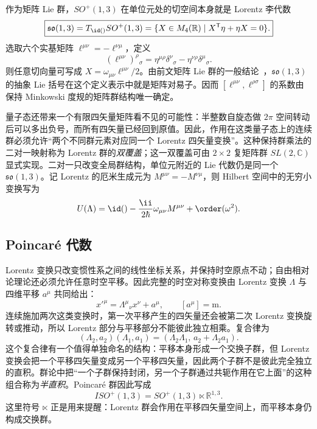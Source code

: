 作为矩阵 Lie 群，$SO^+(1,3)$ 在单位元处的切空间本身就是 Lorentz 李代数
\begin{equation}
\boxed{
\mathfrak{so}(1,3)
=T_{\id()}SO^+(1,3)
=\{X\in M_4(\mathbb R)\mid X^{\mathsf T}\eta+\eta X=0\}.}
\label{eq:lorentz-lie-algebra-tangent}
\end{equation}
选取六个实基矩阵 $\ell^{\mu\nu}=-\ell^{\nu\mu}$，定义
\begin{equation}
\boxed{
(\ell^{\mu\nu})^\rho{}_{\sigma}
=\eta^{\mu\rho}\delta^\nu{}_{\sigma}
-\eta^{\nu\rho}\delta^\mu{}_{\sigma}.}
\label{eq:lorentz-matrix-basis}
\end{equation}
则任意切向量可写成 $X=\omega_{\mu\nu}\ell^{\mu\nu}/2$。由前文矩阵 Lie 群的一般结论~，$\mathfrak{so}(1,3)$ 的抽象 Lie 括号在这个定义表示中就是矩阵对易子。因而 $[\ell^{\mu\nu},\ell^{\rho\sigma}]$ 的系数由保持 Minkowski 度规的矩阵群结构唯一确定。

量子态还带来一个有限四矢量矩阵看不见的可能性：半整数自旋态做 $2\pi$ 空间转动后可以多出负号，而所有四矢量已经回到原值。因此，作用在这类量子态上的连续群必须允许“两个不同群元素对应同一个 Lorentz 四矢量变换”。这种保持群乘法的二对一映射称为 Lorentz 群的\emph{双覆盖}；这一双覆盖可由 $2\times2$ 复矩阵群 $SL(2,\mathbb C)$ 显式实现。二对一只改变全局群结构，单位元附近的 Lie 代数仍是同一个 $\mathfrak{so}(1,3)$。记 Lorentz 的厄米生成元为 $M^{\mu\nu}=-M^{\nu\mu}$，则 Hilbert 空间中的无穷小变换写为
\begin{equation}
 U(\Lambda)
 =\id()-\frac{\ii}{2\hbar}\omega_{\mu\nu}M^{\mu\nu}+\order(\omega^2).
 \label{eq:lorentz-unitary}
\end{equation}
\subsection{Poincar\'e 代数}

Lorentz 变换只改变惯性系之间的线性坐标关系，并保持时空原点不动；自由相对论理论还必须允许任意时空平移。因此完整的时空对称变换由 Lorentz 变换 $\Lambda$ 与四维平移 $a^\mu$ 共同给出：
\begin{equation}
 x'^\mu=\Lambda^\mu{}_{\nu}x^\nu+a^\mu,
 \qquad [a^\mu]=\mathrm m.
 \label{eq:poincare-affine-action-r15}
\end{equation}
连续施加两次这类变换时，第一次平移产生的四矢量还会被第二次 Lorentz 变换旋转或推动，所以 Lorentz 部分与平移部分不能彼此独立相乘。复合律为
\begin{equation}
 \boxed{
 (\Lambda_2,a_2)(\Lambda_1,a_1)
 =(\Lambda_2\Lambda_1,\,a_2+\Lambda_2a_1).}
 \label{eq:poincare-group-law-r15}
\end{equation}
这个复合律有一个值得单独命名的结构：平移本身形成一个交换子群，但 Lorentz 变换会把一个平移四矢量变成另一个平移四矢量，因此两个子群不是彼此完全独立的直积。群论中把“一个子群保持封闭，另一个子群通过共轭作用在它上面”的这种组合称为\emph{半直积}。Poincar\'e 群因此写成
\begin{equation*}
 ISO^+(1,3)=SO^+(1,3)\ltimes\mathbb R^{1,3}.
\end{equation*}
这里符号 $\ltimes$ 正是用来提醒：Lorentz 群会作用在平移四矢量空间上，而平移本身仍构成交换群。

